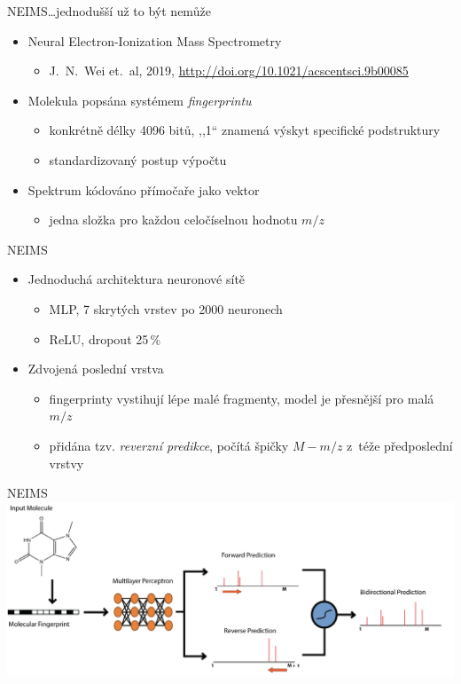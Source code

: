 \documentclass[aspectratio=169]{beamer}
\begin{document}
\begin{frame}
{NEIMS}{\dots jednodušší už to být nemůže}
\begin{itemize}
\item Neural Electron-Ionization Mass Spectrometry
\begin{itemize}
\item J.~N.~Wei et.~al, 2019, \url{http://doi.org/10.1021/acscentsci.9b00085}
\end{itemize}
\pause
\medskip
\item Molekula popsána systémem \emph{fingerprintu}
\begin{itemize}
\item konkrétně délky 4096 bitů, ,,1`` znamená výskyt specifické podstruktury
\item standardizovaný postup výpočtu
\end{itemize}
\item Spektrum kódováno přímočaře jako vektor
\begin{itemize}
\item jedna složka pro každou celočíselnou hodnotu $m/z$
\end{itemize}
\end{itemize}
\end{frame}

\begin{frame}
{NEIMS}
\begin{itemize}
\item Jednoduchá architektura neuronové sítě
\begin{itemize}
\item MLP, 7 skrytých vrstev po 2000 neuronech
\item ReLU, dropout 25\,\%
\end{itemize}
\item Zdvojená poslední vrstva
\begin{itemize}
\item fingerprinty vystihují lépe malé fragmenty, model je přesnější pro malá $m/z$
\item přidána tzv. \emph{reverzní predikce}, počítá špičky $M-m/z$ z~téže předposlední vrstvy
\end{itemize}
\end{itemize}
\end{frame}

\begin{frame}
{NEIMS}
\includegraphics[width=\hsize]{neims.png}
\end{frame}
\end{document}
